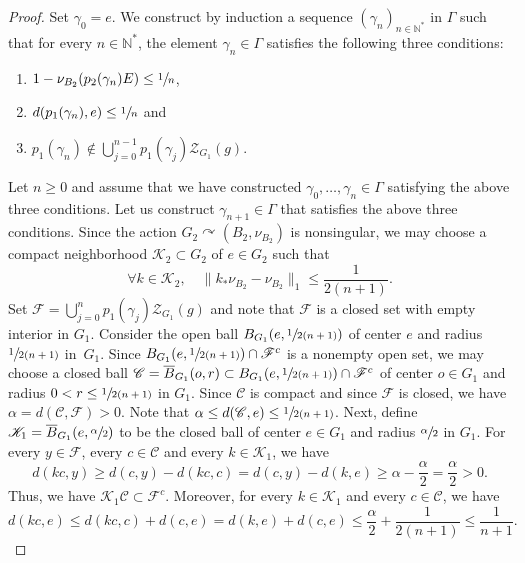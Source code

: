\documentclass[JEP,XML,SOM,Unicode,published]{cedram}
\newenvironment{enumeratei}
{\bgroup\def\theenumi{\roman{enumi}}\def\theenumii{\arabic{enumii}}\begin{enumerate}}
{\end{enumerate}\egroup}
\theoremstyle{definition}
\newcommand{\N}{\mathbb{N}}
\begin{document}
\begin{proof}
Set $\gamma_0 = e$. We construct by induction a sequence $(\gamma_n)_{n \in \N^*}$ in $\Gamma$ such that for every $n \in \N^*$, the element $\gamma_n \in \Gamma$ satisfies the following three conditions:
\begin{enumeratei}
\item
$1 - \nu_{B_2}(p_2(\gamma_n) E) \leq \sfrac{1}{n}$,
\item
$d(p_1(\gamma_n), e) \leq \sfrac{1}{n}$ and
\item
$p_1(\gamma_{n}) \notin \bigcup_{j = 0}^{n - 1} p_1(\gamma_j)\mathscr Z_{G_1}(g)$.
\end{enumeratei}
Let $n \geq 0$ and assume that we have constructed $\gamma_0, \dots, \gamma_n \in \Gamma$ satisfying the above three conditions. Let us construct $\gamma_{n + 1} \in \Gamma$ that satisfies the above three conditions. Since the action $G_2 \curvearrowright (B_2, \nu_{B_2})$ is nonsingular, we may choose a compact neighborhood $\mathscr K_2 \subset G_2$ of $e \in G_2$ such that
\[
\forall k \in \mathscr K_2, \quad \|{k}_\ast \nu_{B_2} - \nu_{B_2}\|_{1} \leq \frac{1}{2(n + 1)}.
\]
Set $\mathscr F = \bigcup_{j = 0}^n p_1(\gamma_j)\mathscr Z_{G_1}(g)$ and note that $\mathscr F$ is a closed set with empty interior in $G_1$. Consider the open ball $B_{G_1}(e, \sfrac{1}{2(n + 1)})$ of center $e$ and radius $\sfrac{1}{2(n + 1)}$ in~$G_1$. Since $B_{G_1}(e, \sfrac{1}{2(n + 1)}) \cap \mathscr F^c$ is a nonempty open set, we may choose a closed ball $\mathscr C = \overline B_{G_1}(o, r) \subset B_{G_1}(e, \sfrac{1}{2(n + 1)}) \cap \mathscr F^c$ of center $o \in G_1$ and radius $0 < r \leq \sfrac{1}{2(n + 1)}$ in $G_1$. Since $\mathscr C$ is compact and since $\mathscr F$ is closed, we have $\alpha = d(\mathscr C , \mathscr F) > 0$. Note that $\alpha \leq d(\mathscr C, e) \leq \sfrac{1}{2(n + 1)}$. Next, define $\mathscr K_1 = \overline B_{G_1}(e, \sfrac{\alpha}{2})$ to be the closed ball of center $e \in G_1$ and radius $\sfrac{\alpha}{2}$ in $G_1$. For every $y \in \mathscr F$, every $c \in \mathscr C$ and every $k \in \mathscr K_1$, we have
\[
d(kc, y) \geq d(c, y) - d(kc, c) = d(c, y) - d(k, e) \geq \alpha - \frac{\alpha}{2} = \frac{\alpha}{2} > 0.
\]
Thus, we have $\mathscr K_1 \mathscr C \subset \mathscr F^c$. Moreover, for every $k \in \mathscr K_1$ and every $c \in \mathscr C$, we have
\[
d(kc, e) \leq d(kc, c) + d(c, e) = d(k, e) + d(c, e) \leq \frac{\alpha}{2} + \frac{1}{2(n + 1)} \leq \frac{1}{n + 1}.
\]


\end{proof}
\end{document}
